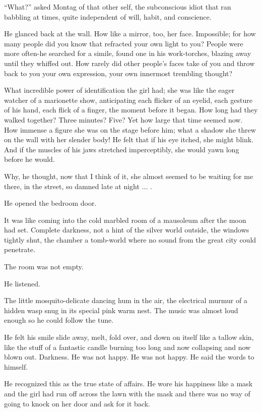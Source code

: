 \documentclass[11pt,openany]{book}
\begin{document}
``What?'' asked Montag of that other self, the subconscious idiot that ran babbling at times, quite independent of will, habit, and conscience.

He glanced back at the wall. How like a mirror, too, her face. Impossible; for how many people did you know that refracted your own light to you? People were more often-he searched for a simile, found one in his work-torches, blazing away until they whiffed out. How rarely did other people's faces take of you and throw back to you your own expression, your own innermost trembling thought?

What incredible power of identification the girl had; she was like the eager watcher of a marionette show, anticipating each flicker of an eyelid, each gesture of his hand, each flick of a finger, the moment before it began. How long had they walked together? Three minutes? Five? Yet how large that time seemed now. How immense a figure she was on the stage before him; what a shadow she threw on the wall with her slender body! He felt that if his eye itched, she might blink. And if the muscles of his jaws stretched imperceptibly, she would yawn long before he would.

Why, he thought, now that I think of it, she almost seemed to be waiting for me there, in the street, so damned late at night ... .

He opened the bedroom door.

It was like coming into the cold marbled room of a mausoleum after the moon had set. Complete darkness, not a hint of the silver world outside, the windows tightly shut, the chamber a tomb-world where no sound from the great city could penetrate.

The room was not empty.

He listened.

The little mosquito-delicate dancing hum in the air, the electrical murmur of a hidden wasp snug in its special pink warm nest. The music was almost loud enough so he could follow the tune.

He felt his smile slide away, melt, fold over, and down on itself like a tallow skin, like the stuff of a fantastic candle burning too long and now collapsing and now blown out. Darkness. He was not happy. He was not happy. He said the words to himself.

He recognized this as the true state of affairs. He wore his happiness like a mask and the girl had run off across the lawn with the mask and there was no way of going to knock on her door and ask for it back.
\end{document}
